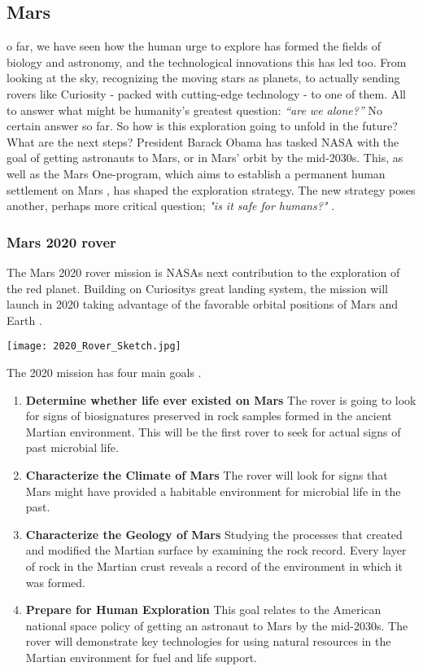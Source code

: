 ﻿\subsection{Mars}
o far, we have seen how the human urge to explore has formed the fields of biology and astronomy, and the technological innovations this has led too.
From looking at the sky, recognizing the moving stars as planets, to actually sending rovers like Curiosity - packed with cutting-edge technology - to one of them.
All to answer what might be humanity's greatest question: \emph{“are we alone?”}
No certain answer so far.
So how is this exploration going to unfold in the future?
What are the next steps?
President Barack Obama has tasked NASA with the goal of getting astronauts to Mars, or in Mars' orbit by the mid-2030s.
This, as well as the Mars One-program, which aims to establish a permanent human settlement on Mars \cite{FPlan12}, has shaped the exploration strategy.
The new strategy poses another, perhaps more critical question; \emph{"is it safe for humans?"} \cite{FPlan01}.

\subsubsection{Mars 2020 rover}

The Mars 2020 rover mission is NASAs next contribution to the exploration of the red planet. 
Building on Curiositys great landing system, the mission will launch in 2020 taking advantage of the favorable orbital positions of Mars and Earth \cite{FPlan14}. 

\begin{center}
	\texttt{[image: 2020\_Rover\_Sketch.jpg]}
\end{center}
The 2020 mission has four main goals \cite{FPlan13}.

\begin{enumerate}
	\item \textbf{Determine whether life ever existed on Mars}
The rover is going to look for signs of biosignatures preserved in rock samples formed in the ancient Martian environment.
This will be the first rover to seek for actual signs of past microbial life.
	\item \textbf{Characterize the Climate of Mars}
The rover will look for signs that Mars might have provided a habitable environment for microbial life in the past. 
	\item \textbf{Characterize the Geology of Mars}
Studying the processes that created and modified the Martian surface by examining the rock record.
Every layer of rock in the Martian crust reveals a record of the environment in which it was formed.
	\item \textbf{Prepare for Human Exploration}
This goal relates to the American national space policy of getting an astronaut to Mars by the mid-2030s.
The rover will demonstrate key technologies for using natural resources in the Martian environment for fuel and life support. 
\end{enumerate}

